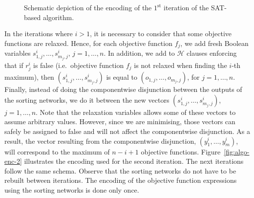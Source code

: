 \documentclass[a4paper,UKenglish,cleveref, autoref, thm-restate]{lipics-v2021}
\begin{document}
\begin{figure}[t]
    \caption{Schematic depiction of the encoding of the $1^{\text{st}}$ iteration of the SAT-based algorithm.}
    \label{fig:algo-enc-1}
\end{figure} 
In the iterations where $i>1$, it is necessary to consider that some
objective functions are relaxed. Hence, for each objective function $f_j$, 
we add fresh Boolean variables $s^i_{1,j},\dots,s^i_{m_j,j}$, $j=1,\dots,n$.
In addition, we add to $\mathcal{H}$ clauses enforcing that if $r^i_j$ is false
(i.e.\ objective function $f_j$ is not relaxed when finding the $i$-th maximum), 
then $(s^i_{1,j},\dots,s^i_{m_j,j})$ is equal to $(o_{1,j},\dots,o_{m_j,j})$, for 
$j=1,\dots,n$.
Finally, instead of doing the componentwise disjunction between the outputs of the sorting networks, we do it between the new vectors $(s^i_{1,j},\dots,s^i_{m_j,j})$, $j=1,\dots,n$.
Note that the relaxation variables allows some of these vectors to assume 
arbitrary values. However, since we are minimising, those vectors can safely
be assigned to false and will not affect the componentwise disjunction.
As a result, the vector resulting from the componentwise disjunction, $(y^i_1,\dots,y^i_m)$, will correspond to the maximum of $n-i+1$ objective functions.
Figure~\ref{fig:algo-enc-2} illustrates the encoding used for the second iteration. The next iterations follow the same schema. 
Observe that the sorting networks do not have to be rebuilt between iterations.
The encoding of the objective function expressions using the sorting networks 
is done only once.
\end{document}
